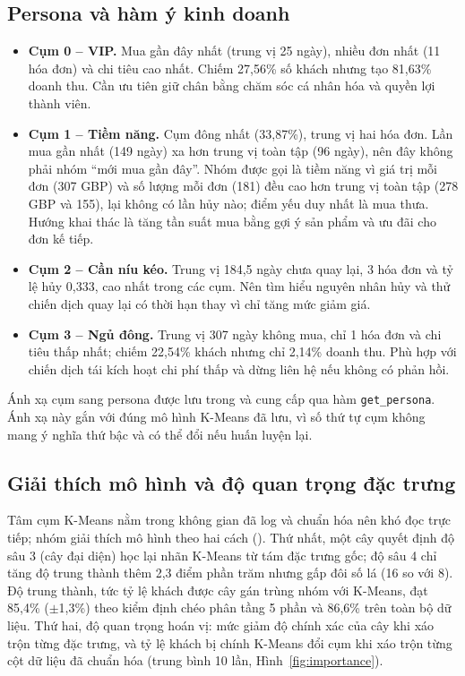 \documentclass[../report.tex]{subfiles}
\begin{document}
\subsection{Persona và hàm ý kinh doanh}

\begin{itemize}[leftmargin=1.5em]
\item \textbf{Cụm 0 -- VIP.} Mua gần đây nhất (trung vị 25 ngày), nhiều đơn nhất (11 hóa đơn) và chi tiêu cao nhất. Chiếm 27,56\% số khách nhưng tạo 81,63\% doanh thu. Cần ưu tiên giữ chân bằng chăm sóc cá nhân hóa và quyền lợi thành viên.
\item \textbf{Cụm 1 -- Tiềm năng.} Cụm đông nhất (33,87\%), trung vị hai hóa đơn. Lần mua gần nhất (149 ngày) xa hơn trung vị toàn tập (96 ngày), nên đây không phải nhóm ``mới mua gần đây''. Nhóm được gọi là tiềm năng vì giá trị mỗi đơn (307 GBP) và số lượng mỗi đơn (181) đều cao hơn trung vị toàn tập (278 GBP và 155), lại không có lần hủy nào; điểm yếu duy nhất là mua thưa. Hướng khai thác là tăng tần suất mua bằng gợi ý sản phẩm và ưu đãi cho đơn kế tiếp.
\item \textbf{Cụm 2 -- Cần níu kéo.} Trung vị 184,5 ngày chưa quay lại, 3 hóa đơn và tỷ lệ hủy 0,333, cao nhất trong các cụm. Nên tìm hiểu nguyên nhân hủy và thử chiến dịch quay lại có thời hạn thay vì chỉ tăng mức giảm giá.
\item \textbf{Cụm 3 -- Ngủ đông.} Trung vị 307 ngày không mua, chỉ 1 hóa đơn và chi tiêu thấp nhất; chiếm 22,54\% khách nhưng chỉ 2,14\% doanh thu. Phù hợp với chiến dịch tái kích hoạt chi phí thấp và dừng liên hệ nếu không có phản hồi.
\end{itemize}

Ánh xạ cụm sang persona được lưu trong  và cung cấp qua hàm \texttt{get\_persona}. Ánh xạ này gắn với đúng mô hình K-Means đã lưu, vì số thứ tự cụm không mang ý nghĩa thứ bậc và có thể đổi nếu huấn luyện lại.

\subsection{Giải thích mô hình và độ quan trọng đặc trưng}
\label{sec:explain}

Tâm cụm K-Means nằm trong không gian đã log và chuẩn hóa nên khó đọc trực tiếp; nhóm giải thích mô hình theo hai cách (). Thứ nhất, một cây quyết định độ sâu 3 (cây đại diện) học lại nhãn K-Means từ tám đặc trưng gốc; độ sâu 4 chỉ tăng độ trung thành thêm 2,3 điểm phần trăm nhưng gấp đôi số lá (16 so với 8). Độ trung thành, tức tỷ lệ khách được cây gán trùng nhóm với K-Means, đạt 85,4\% ($\pm$1,3\%) theo kiểm định chéo phân tầng 5 phần và 86,6\% trên toàn bộ dữ liệu. Thứ hai, độ quan trọng hoán vị: mức giảm độ chính xác của cây khi xáo trộn từng đặc trưng, và tỷ lệ khách bị chính K-Means đổi cụm khi xáo trộn từng cột dữ liệu đã chuẩn hóa (trung bình 10 lần, Hình~\ref{fig:importance}).
\end{document}
